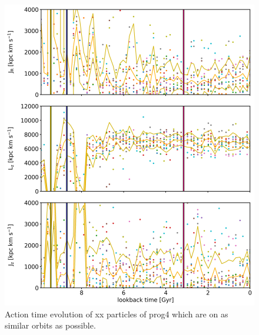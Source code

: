 \begin{figure}[htbp]
\captionsetup{format=plain}
    \centering
	\includegraphics[width=\textwidth]{plots/Dynamics/prog4/action_time_evolution_box_hist_mean_prog4.png}
    \caption{Action time evolution of xx particles of prog4 which are on as similar orbits as possible. }\label{fig:actions_box_time_evolution_prog4}
\end{figure}
